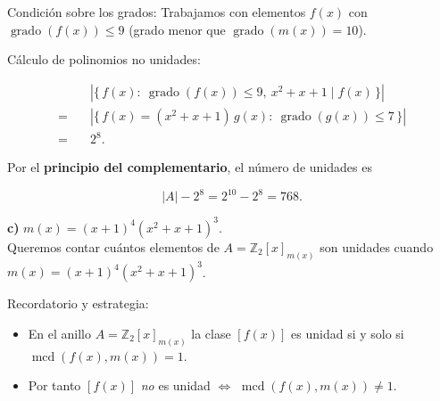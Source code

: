 \documentclass[a4paper,12pt]{article}
\begin{document}
\begin{ejercicio}[title=Ejercicio 10]
Condición sobre los grados:
Trabajamos con elementos \(f(x)\) con \(\operatorname{grado}(f(x))\le 9\) (grado menor que \(\operatorname{grado}(m(x))=10\)).

\vspace{0.5em}

Cálculo de polinomios no unidades:

\[
\begin{aligned}
&\left|\{\,f(x):\ \operatorname{grado}(f(x))\le 9,\ x^2+x+1\mid f(x)\,\}\right| \\
=\quad&\left|\{\,f(x)=(x^2+x+1)\,g(x):\ \operatorname{grado}(g(x))\le 7\,\}\right| \\
=\quad&2^{8}.
\end{aligned}
\]

Por el \textbf{principio del complementario}, el número de unidades es

\[
|A| - 2^{8} = 2^{10} - 2^{8} = \boxed{768}.
\]

\vspace{0.5em}

\textbf{c)} \quad $m(x) = (x+1)^4(x^2+x+1)^3$. \\

Queremos contar cuántos elementos de  \(A=\mathbb{Z}_2[x]_{m(x)}\) son unidades cuando $m(x) = (x+1)^4(x^2+x+1)^3$.

\vspace{0.5em}

Recordatorio y estrategia:
\begin{itemize}
\item En el anillo \(A=\mathbb{Z}_2[x]_{m(x)}\) la clase \([f(x)]\) es unidad si y solo si \(\operatorname{mcd}(f(x),m(x))=1\).
\item Por tanto \([f(x)]\) \emph{no} es unidad \(\Longleftrightarrow\) \(\operatorname{mcd}(f(x),m(x))\neq 1\).
\end{itemize}
\end{ejercicio}
\end{document}
